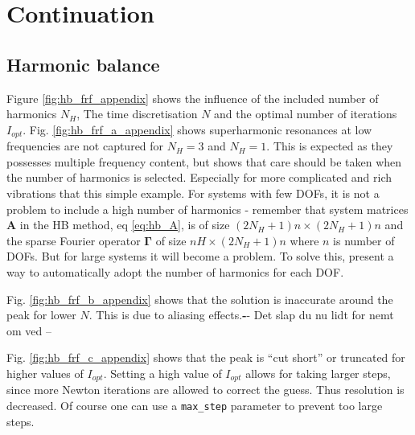 
\chapter{Continuation}
\label{chap:cont_appendix}

\section{Harmonic balance}
\label{sec:hb_appendix}

Figure \ref{fig:hb_frf_appendix} shows the influence of the included number of
harmonics $N_H$, The time discretisation $N$ and the optimal number of
iterations $I_{opt}$. Fig. \ref{fig:hb_frf_a_appendix} shows superharmonic
resonances at low frequencies are not captured for $N_H=3$ and $N_H=1$. This is
expected as they possesses multiple frequency content, but shows that care
should be taken when the number of harmonics is selected. Especially for more
complicated and rich vibrations that this simple example.
For systems with few DOFs, it is not a problem to include a high number of
harmonics - remember that system matrices $\bm A$ in the HB method, eq
\eqref{eq:hb_A}, is of size $(2N_H + 1)n \times (2N_H + 1)n$ and the sparse
Fourier operator $\bm \Gamma$ of size $nH \times(2N_H+1)n$ where $n$ is number
of DOFs. But for large systems it will become a problem. To solve this,
\citet{GROLET2012a} present a way to automatically adopt the number of harmonics
for each DOF.

Fig. \ref{fig:hb_frf_b_appendix} shows that the solution is inaccurate around
the peak for lower $N$. This is due to aliasing effects.{\textbf -- Det slap du
  nu lidt for nemt om ved --}

Fig. \ref{fig:hb_frf_c_appendix} shows that the peak is ``cut short'' or
truncated for higher values of $I_{opt}$. Setting a high value of $I_{opt}$
allows for taking larger steps, since more Newton iterations are allowed to
correct the guess. Thus resolution is decreased. Of course one can use a
\texttt{max\_step} parameter to prevent too large steps.

